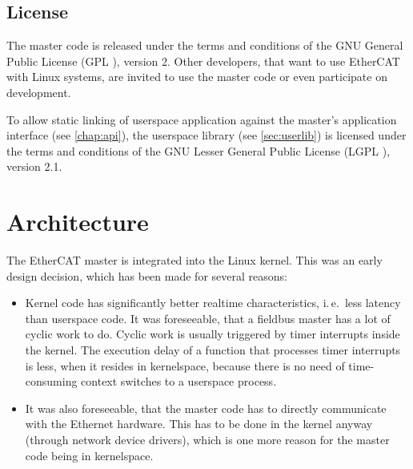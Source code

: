 \documentclass[a4paper,12pt,BCOR6mm,bibtotoc,idxtotoc]{scrbook}
\begin{document}

\section{License}
\label{sec:license}

The master code is released under the terms and conditions of the GNU General
Public License (GPL \cite{gpl}), version 2. Other developers, that
want to use EtherCAT with Linux systems, are invited to use the master code or
even participate on development.

To allow static linking of userspace application against the master's
application interface (see \autoref{chap:api}), the userspace library (see
\autoref{sec:userlib}) is licensed under the terms and conditions of the GNU
Lesser General Public License (LGPL \cite{lgpl}), version 2.1.


\chapter{Architecture}
\label{chap:arch}

The EtherCAT master is integrated into the Linux kernel. This was an early
design decision, which has been made for several reasons:

\begin{itemize}

\item Kernel code has significantly better realtime characteristics, i.\,e.\
less latency than userspace code. It was foreseeable, that a fieldbus master
has a lot of cyclic work to do. Cyclic work is usually triggered by timer
interrupts inside the kernel. The execution delay of a function that processes
timer interrupts is less, when it resides in kernelspace, because there is no
need of time-consuming context switches to a userspace process.

\item It was also foreseeable, that the master code has to directly
communicate with the Ethernet hardware. This has to be done in the kernel
anyway (through network device drivers), which is one more reason for the
master code being in kernelspace.

\end{itemize}
\end{document}

